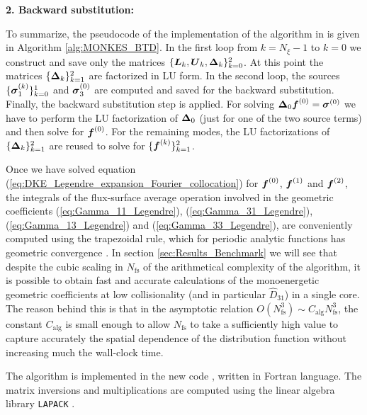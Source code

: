 \begin{algorithm}
\begin{algorithmic}
		\EndFor
		
		
		
		\State{}
	\end{algorithmic}
	
	\textbf{2. Backward substitution:}
	\begin{algorithmic}%
		\EndFor
	\end{algorithmic}
\end{algorithm}


To summarize, the pseudocode of the implementation of the algorithm in {\MONKES} is given in Algorithm \ref{alg:MONKES_BTD}. In the first loop from $k=N_\xi-1$ to $k=0$ we construct and save only the matrices $\{\vb*{L}_k,\vb*{U}_k, \vb*{\Delta}_k\}_{k=0}^{2}$. At this point the matrices $\{\vb*{\Delta}_k\}_{k=1}^{2}$ are factorized in LU form. In the second loop, the sources $\{\vb*{\sigma}_1^{(k)}\}_{k=0}^{1}$ and $\vb*{\sigma}_3^{(0)}$ are computed and saved for the backward substitution. Finally, the backward substitution step is applied. For solving $\vb*{\Delta}_0 \vb*{f}^{(0)} = \vb*{\sigma}^{(0)}$ we have to perform the LU factorization of $\vb*{\Delta}_0$ (just for one of the two source terms) and then solve for $\vb*{f}^{(0)}$. For the remaining modes, the LU factorizations of $\{\vb*{\Delta}_k\}_{k=1}^{2}$ are reused to solve for $\{\vb*{f}^{(k)}\}_{k=1}^{2}$.

Once we have solved equation (\ref{eq:DKE_Legendre_expansion_Fourier_collocation}) for $\vb*{f}^{(0)}$, $\vb*{f}^{(1)}$ and $\vb*{f}^{(2)}$, the integrals of the flux-surface average operation involved in the geometric coefficients (\ref{eq:Gamma_11_Legendre}), (\ref{eq:Gamma_31_Legendre}), (\ref{eq:Gamma_13_Legendre}) and (\ref{eq:Gamma_33_Legendre}), are conveniently computed using the trapezoidal rule, which for periodic analytic functions has geometric convergence \cite{Trapezoidal}. In section \ref{sec:Results_Benchmark} we will see that despite the cubic scaling in $N_{\text{fs}}$ of the arithmetical complexity of the algorithm, it is possible to obtain fast and accurate calculations of the monoenergetic geometric coefficients at low collisionality (and in particular $\widehat{D}_{31}$) in a single core. The reason behind this is that in the asymptotic relation $O(N_{\text{fs}}^3)\sim C_{\text{alg}} N_{\text{fs}}^3$, the constant $C_{\text{alg}}$ is small enough to allow $N_{\text{fs}}$ to take a sufficiently high value to capture accurately the spatial dependence of the distribution function without increasing much the wall-clock time. 

The algorithm is implemented in the new code {\MONKES}, written in Fortran language. The matrix inversions and multiplications are computed using the linear algebra library \texttt{LAPACK} \cite{lapack99}.